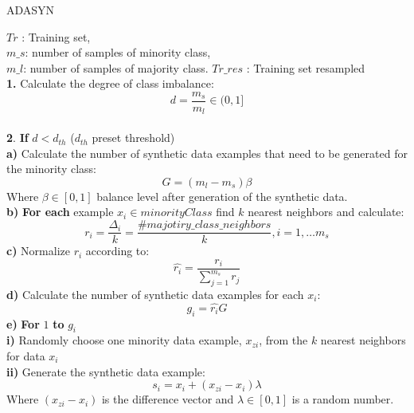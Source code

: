 \documentclass[italian,12pt,a4paper]{article}
\begin{document}
		\begin{algorithm}
		\caption{ADASYN}
		\begin{algorithmic}
			\Require $Tr$ : Training set, \\ $m\_s$: number of samples of minority class, \\ $m\_l$: number of samples of majority class.
			\Ensure $Tr\_res$ : Training set resampled \\
			\textbf{1.} Calculate the degree of class imbalance: $$d = \frac{m_s}{m_l} \in (0, 1]$$  \\
			\textbf{2}. \textbf{If} {$d < d_{th}$} ($d_{th}$ preset threshold) \\
						\quad\textbf{a)} Calculate the number of synthetic data examples that
						need to be generated for the minority class: $$G = (m_l - m_s)\beta$$
						\quad Where $\beta \in [0, 1]$ balance level after generation of the synthetic data. \\
						\quad \textbf{b)} \textbf{For each} example $x_i \in minorityClass$ find $k$ nearest neighbors and calculate: $$r_i = \frac{\Delta_i}{k} = \frac{\# majotiry\_class\_neighbors}{k}, i = 1, \dots m_s$$
						\quad \textbf{c)} Normalize $r_i$ according to: $$\hat{r_i} = \frac{r_i}{\sum_{j = 1}^{m_s} r_j}$$
						\quad \textbf{d)} Calculate the number of synthetic data examples for each $x_i$: $$g_i = \hat{r_i} G$$
						\quad \textbf{e)} \textbf{For} $1$ \textbf{to} $g_i$ \\
						\quad \quad \textbf{i)} Randomly choose one minority data example, $x_{zi}$,
						from the $k$ nearest neighbors for data $x_i$ \\
						\quad \quad \textbf{ii)} Generate the synthetic data example: $$s_i = x_i + (x_{zi} - x_i)\lambda$$
						Where $(x_{zi} - x_i)$ is the difference vector and $\lambda \in [0,1]$ is a random number. \\

		\end{algorithmic}
	\end{algorithm}
\end{document}
